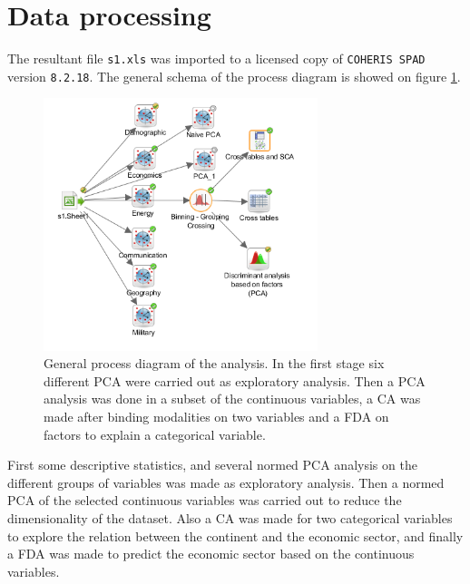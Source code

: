 \documentclass[a4paper,10pt,twocolumn]{article}
\begin{document}
%

\section{Data processing}
The resultant file \texttt{s1.xls} was imported to a licensed copy of \texttt{COHERIS SPAD} version \texttt{8.2.18}. The general schema of the process diagram is showed on figure \ref{schema}. 

\begin{figure}[!ht]
\begin{center}
\includegraphics[width=8cm]{schema.png}
\caption{\footnotesize{General process diagram of the analysis. In the first stage six different PCA were carried out as exploratory analysis. Then a PCA analysis was done in a subset of the continuous variables, a CA was made after binding modalities on two variables and a FDA on factors to explain a categorical variable.}\label{schema}}
\end{center}
\end{figure}

First some descriptive statistics, and several %
normed PCA analysis on the different groups of variables was made as exploratory analysis. Then a normed PCA of the selected continuous variables was carried out to reduce the dimensionality of the dataset. Also a CA was made for two categorical variables to explore the relation between the continent and the economic sector, and finally a FDA was made to predict the economic sector based on the continuous variables. 
\end{document}
